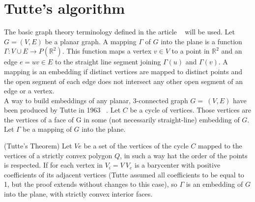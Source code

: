 \section{Tutte's algorithm}

The basic graph theory terminology defined in the article ~\cite{pa, pb}
will be used.  Let $G=(V,E)$ be a planar graph. A mapping $\Gamma$ of $G$
into the plane is a function $\Gamma : V \cup E \to P(\mathbb{R}^2)$. This
function maps a vertex $v \in V$ to a point in $\mathbb{R}^2$ and an edge
$e = uv \in E$ to the straight line segment joining $\Gamma(u)$ and
$\Gamma(v)$.  A mapping is an embedding if distinct vertices are mapped to
distinct points and the open segment of each edge does not intersect any
other open segment of an edge or a vertex.
\\

A way to build embeddings of any planar, 3-connected graph $G=~(V,E)$ have
been produced by Tutte in 1963 ~\cite{pc}. Let $C$ be a cycle of
vertices. Those vertices are the vertices of a face of G in some (not
necessarily straight-line) embedding of $G$. Let $\Gamma$ be a mapping of
$G$ into the plane.






\begin{theo} \label{theo:box} (Tutte’s Theorem) Let $Ve$ be a set of the
  vertices of the cycle $C$ mapped to the vertices of a strictly convex
  polygon $Q$, in such a way hat the order of the points is respected.  If
  for each vertex in $V_i = V \ V_e$ is a barycenter with positive
  coefficients of its adjacent vertices (Tutte assumed all coefficients to
  be equal to 1, but the proof extends without changes to this case), so
  $\Gamma$ is an embedding of $G$ into the plane, with strictly convex
  interior faces.
\end{theo}

